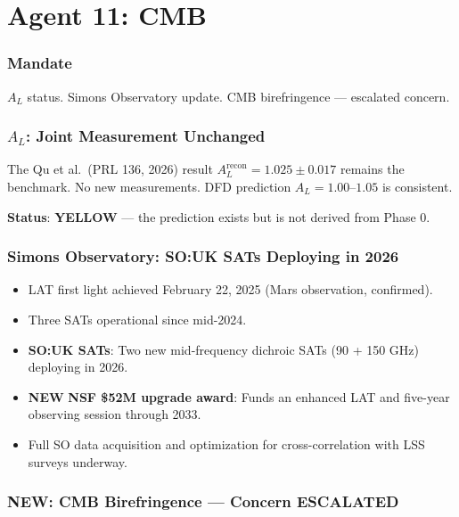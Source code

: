 \documentclass[11pt,a4paper]{article}
\newcommand{\YELLOW}{\textcolor{dfdyellow}{\textbf{YELLOW}}}
\newcommand{\NEW}{\textcolor{dfdblue}{\textbf{NEW}}}
\begin{document}
\part{Agent 11: CMB}
\label{part:agent11}

\section{Mandate}

$A_L$ status. Simons Observatory update. CMB birefringence --- escalated concern.

\section{$A_L$: Joint Measurement Unchanged}

The Qu et al.\ (PRL 136, 2026) result $A_L^{\text{recon}} = 1.025 \pm 0.017$ remains the benchmark. No new measurements. DFD prediction $A_L = 1.00$--$1.05$ is consistent.

\textbf{Status}: \YELLOW{} --- the prediction exists but is not derived from Phase 0.

\section{Simons Observatory: SO:UK SATs Deploying in 2026}

\begin{itemize}
\item LAT first light achieved February 22, 2025 (Mars observation, confirmed).
\item Three SATs operational since mid-2024.
\item \textbf{SO:UK SATs}: Two new mid-frequency dichroic SATs (90 + 150 GHz) deploying in 2026.
\item \NEW{} \textbf{NSF \$52M upgrade award}: Funds an enhanced LAT and five-year observing session through 2033.
\item Full SO data acquisition and optimization for cross-correlation with LSS surveys underway.
\end{itemize}

\section{\NEW: CMB Birefringence --- Concern ESCALATED}
\end{document}
